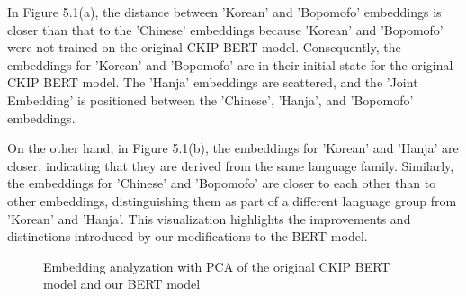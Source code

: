 \documentclass[PhD]{PHlab-thesis}
\begin{document}
In Figure 5.1(a), the distance between 'Korean' and 'Bopomofo' embeddings is closer than that to the 'Chinese' embeddings because 'Korean' and 'Bopomofo' were not trained on the original CKIP BERT model. Consequently, the embeddings for 'Korean' and 'Bopomofo' are in their initial state for the original CKIP BERT model. The 'Hanja' embeddings are scattered, and the 'Joint Embedding' is positioned between the 'Chinese', 'Hanja', and 'Bopomofo' embeddings.

On the other hand, in Figure 5.1(b), the embeddings for 'Korean' and 'Hanja' are closer, indicating that they are derived from the same language family. Similarly, the embeddings for 'Chinese' and 'Bopomofo' are closer to each other than to other embeddings, distinguishing them as part of a different language group from 'Korean' and 'Hanja'. This visualization highlights the improvements and distinctions introduced by our modifications to the BERT model.

\begin{figure}[h!]
  \centering
  \hfill
  \captionsetup{type=figure}
  \caption{Embedding analyzation with PCA of the original CKIP BERT model and our BERT model}
  \label{fig:naver dictionary}
\end{figure}
\end{document}
